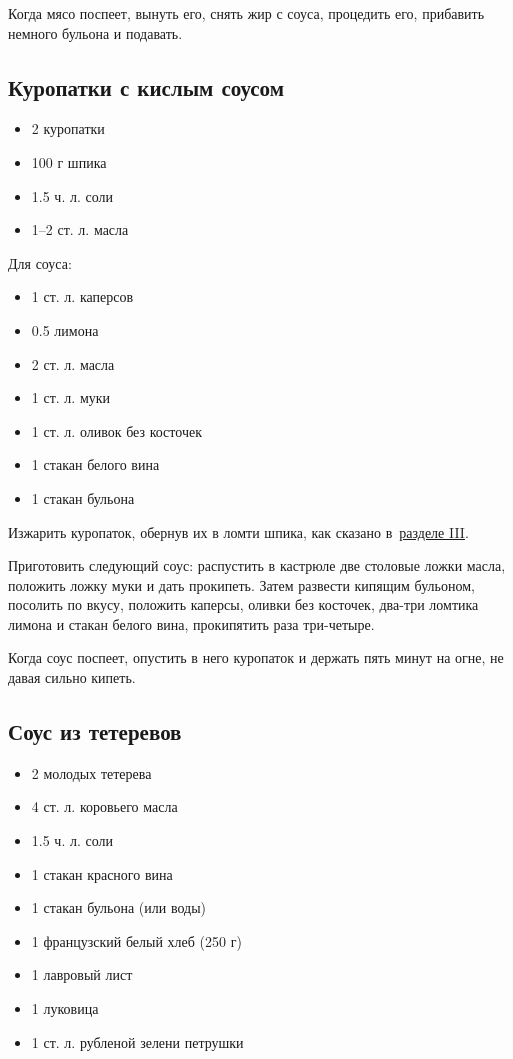 Когда мясо поспеет, вынуть его, снять жир с соуса, процедить его, прибавить немного бульона и подавать.

\subsection{Куропатки с кислым соусом}

\begin{itemize}
	\item 2 куропатки
    \item 100 г шпика
    \item 1.5 ч. л. соли
    \item 1–2 ст. л. масла
\end{itemize}

Для соуса: 

\begin{itemize}
	\item 1 ст. л. каперсов
    \item 0.5 лимона
    \item 2 ст. л. масла
    \item 1 ст. л. муки
    \item 1 ст. л. оливок без косточек
    \item 1 стакан белого вина
    \item 1 стакан бульона
\end{itemize}

Изжарить куропаток, обернув их в ломти шпика, как сказано в~\hyperref[3sec:obschie-zharkoje]{разделе III}.

Приготовить следующий соус: распустить в кастрюле две столовые ложки масла, положить ложку муки и дать прокипеть. Затем развести кипящим бульоном, посолить по вкусу, положить каперсы, оливки без косточек, два-три ломтика лимона и стакан белого вина, прокипятить раза три-четыре.

Когда соус поспеет, опустить в него куропаток и держать пять минут на огне, не давая сильно кипеть.

\subsection{Соус из тетеревов}

\begin{itemize}
	\item 2 молодых тетерева
    \item 4 ст. л. коровьего масла
    \item 1.5 ч. л. соли
    \item 1 стакан красного вина
    \item 1 стакан бульона (или воды)
    \item 1 французский белый хлеб (250 г)
    \item 1 лавровый лист
    \item 1 луковица
    \item 1 ст. л. рубленой зелени петрушки
\end{itemize}

